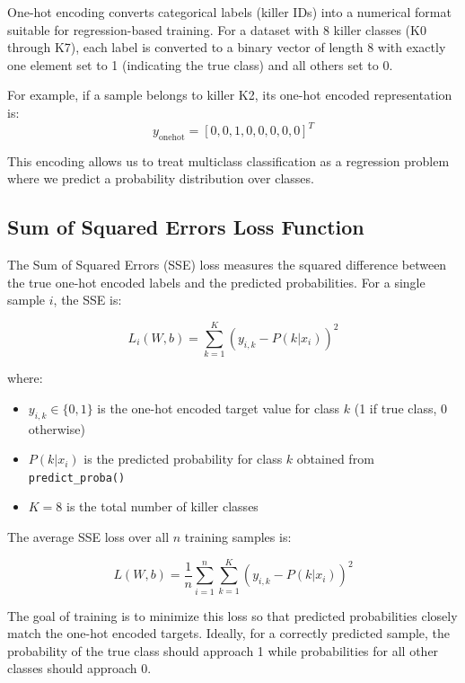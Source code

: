 \documentclass[12pt]{article}
\begin{document}
One-hot encoding converts categorical labels (killer IDs) into a numerical format suitable for regression-based training. For a dataset with 8 killer classes (K0 through K7), each label is converted to a binary vector of length 8 with exactly one element set to 1 (indicating the true class) and all others set to 0.

For example, if a sample belongs to killer K2, its one-hot encoded representation is:
\begin{equation}
y_{\text{onehot}} = [0, 0, 1, 0, 0, 0, 0, 0]^T
\end{equation}

This encoding allows us to treat multiclass classification as a regression problem where we predict a probability distribution over classes.

\subsection{Sum of Squared Errors Loss Function}

The Sum of Squared Errors (SSE) loss measures the squared difference between the true one-hot encoded labels and the predicted probabilities. For a single sample $i$, the SSE is:

\begin{equation}
L_i(W, b) = \sum_{k=1}^{K} (y_{i,k} - P(k|x_i))^2
\end{equation}

where:
\begin{itemize}
    \item $y_{i,k} \in \{0, 1\}$ is the one-hot encoded target value for class $k$ (1 if true class, 0 otherwise)
    \item $P(k|x_i)$ is the predicted probability for class $k$ obtained from \texttt{predict\_proba()}
    \item $K = 8$ is the total number of killer classes
\end{itemize}

The average SSE loss over all $n$ training samples is:

\begin{equation}
L(W, b) = \frac{1}{n} \sum_{i=1}^{n} \sum_{k=1}^{K} (y_{i,k} - P(k|x_i))^2
\end{equation}

The goal of training is to minimize this loss so that predicted probabilities closely match the one-hot encoded targets. Ideally, for a correctly predicted sample, the probability of the true class should approach 1 while probabilities for all other classes should approach 0.
\end{document}
